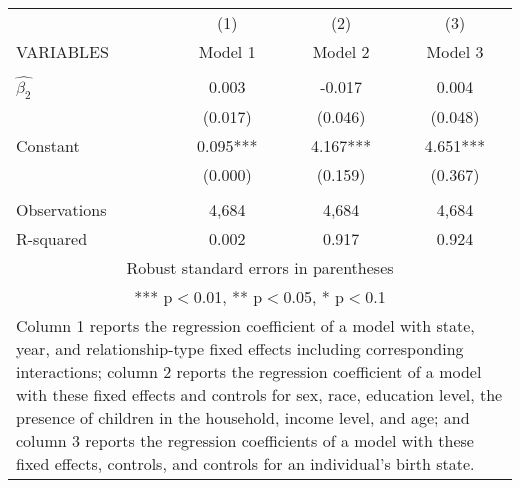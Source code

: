 \begin{tabular}{lccc}
\hline
 & (1) & (2) & (3) \\
VARIABLES & Model 1 & Model 2 & Model 3 \\ \hline
 &  &  &  \\
$\hat{\beta_2}$ & 0.003 & -0.017 & 0.004 \\
 & (0.017) & (0.046) & (0.048) \\
Constant & 0.095*** & 4.167*** & 4.651*** \\
 & (0.000) & (0.159) & (0.367) \\
 &  &  &  \\
Observations & 4,684 & 4,684 & 4,684 \\
 R-squared & 0.002 & 0.917 & 0.924 \\ \hline
\multicolumn{4}{c}{ Robust standard errors in parentheses} \\
\multicolumn{4}{c}{ *** p$<$0.01, ** p$<$0.05, * p$<$0.1} \\
\multicolumn{4}{p{0.6\linewidth}}{\footnotesize Column 1 reports the regression coefficient of a model with state, year, and relationship-type fixed effects including corresponding interactions; column 2 reports the regression coefficient of a model with these fixed effects and controls for sex, race, education level, the presence of children in the household, income level, and age; and column 3 reports the regression coefficients of a model with these fixed effects, controls, and controls for an individual’s birth state.} \\
\end{tabular}
